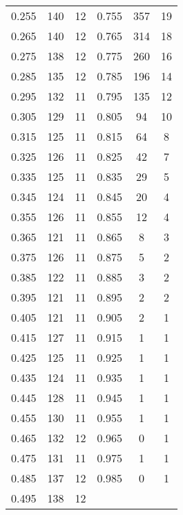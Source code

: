 \begin{table}[h!]
\begin{center}
\begin{tabular}{c|c|c||c|c|c}
0.255 & 140 & 12&	0.755 & 357 & 19\\
0.265 & 140 & 12&	0.765 & 314 & 18\\
0.275 & 138 & 12&	0.775 & 260 & 16\\
0.285 & 135 & 12&	0.785 & 196 & 14\\
0.295 & 132 & 11&	0.795 & 135 & 12\\
0.305 & 129 & 11&	0.805 & 94 & 10\\
0.315 & 125 & 11&	0.815 & 64 & 8\\
0.325 & 126 & 11&	0.825 & 42 & 7\\
0.335 & 125 & 11&	0.835 & 29 & 5\\
0.345 & 124 & 11&	0.845 & 20 & 4\\
0.355 & 126 & 11&	0.855 & 12 & 4\\
0.365 & 121 & 11&	0.865 & 8 & 3\\
0.375 & 126 & 11&	0.875 & 5 & 2\\
0.385 & 122 & 11&	0.885 & 3 & 2\\
0.395 & 121 & 11&	0.895 & 2 & 2\\
0.405 & 121 & 11&	0.905 & 2 & 1\\
0.415 & 127 & 11&	0.915 & 1 & 1\\
0.425 & 125 & 11&	0.925 & 1 & 1\\
0.435 & 124 & 11&	0.935 & 1 & 1\\
0.445 & 128 & 11&	0.945 & 1 & 1\\
0.455 & 130 & 11&	0.955 & 1 & 1\\
0.465 & 132 & 12&	0.965 & 0 & 1\\
0.475 & 131 & 11&	0.975 & 1 & 1\\
0.485 & 137 & 12&	0.985 & 0 & 1\\
0.495 & 138 & 12&	& & \\
\hline \hline
\end{tabular}
\end{center}
\end{table}